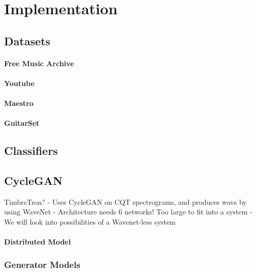 \documentclass[]{article}
\begin{document}
\hypertarget{implementation}{%
\section{Implementation}\label{implementation}}

\hypertarget{datasets}{%
\subsection{Datasets}\label{datasets}}

\paragraph{Free Music Archive}

\paragraph{Youtube}

\paragraph{Maestro}

\paragraph{GuitarSet}

\hypertarget{classifiers}{%
\subsection{Classifiers}\label{classifiers}}

\hypertarget{cyclegan-1}{%
\subsection{CycleGAN}\label{cyclegan-1}}

TimbreTron? - Uses CycleGAN on CQT spectrograms, and produces wavs by
using WaveNet - Architecture needs 6 networks! Too large to fit into a
system - We will look into possibilities of a Wavenet-less system

\paragraph{Distributed Model}

\hypertarget{generator-models}{%
\subsubsection{Generator Models}\label{generator-models}}
\end{document}
